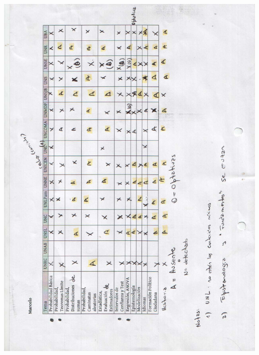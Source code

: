 \documentclass[a4paper,10pt,BCOR10mm,oneside,headsepline]{scrbook}
\begin{document}
\begin{subappendices}
\includegraphics[scale=.3]{01-2.jpg}
\newpage

\end{subappendices}
\end{document}
